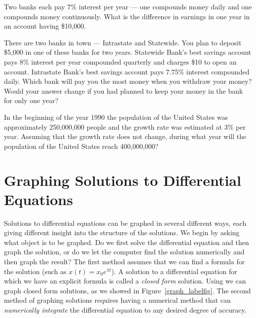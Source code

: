 \begin{exercise} \label{c3.1.8}
Two banks each pay $7\%$ interest per year --- one compounds money
daily and one compounds money continuously.  What is the difference
in earnings in one year in an account having \$10,000.
\end{exercise}

\begin{exercise} \label{c3.1.9}
There are two banks in town --- Intrastate and Statewide.  You plan
to deposit \$5,000 in one of these banks for two years.  Statewide Bank's
best savings account pays $8\%$ interest per year compounded quarterly
and charges \$10 to open an account.  Intrastate Bank's best savings
account pays $7.75\%$ interest compounded daily.  Which bank will
pay you the most money when you withdraw your money?  Would your
answer change if you had planned to keep your money in the bank
for only one year?
\end{exercise}

\begin{exercise} \label{c3.1.10}
In the beginning of the year 1990 the population of the United States was
approximately 250,000,000 people and the growth rate was estimated at $3\%$
per year.  Assuming that the growth rate does not change, during what year
will the population of the United States reach 400,000,000?
\end{exercise}


\section{Graphing Solutions to Differential Equations}
\label{S:3.2}

Solutions to differential equations can be graphed in several
different ways, each giving different insight into the structure
of the solutions.  We begin by asking what object is to be
graphed.  Do we first solve the differential equation and then
graph the solution, or do we let the computer find the solution
numerically and then graph the result?  The first method assumes
that we can find a formula for the solution (such as
$x(t)=x_0e^{\lambda t}$).  A solution to a differential equation
for which we have an explicit formula is called a {\em closed
form\/} solution.  Using \Matlab we
can graph closed form solutions, as we showed in
Figure~\ref{graph_labelfig}. The second method of graphing
solutions requires having a numerical method that can {\em
numerically integrate\/} the differential equation to any
desired degree of accuracy.

